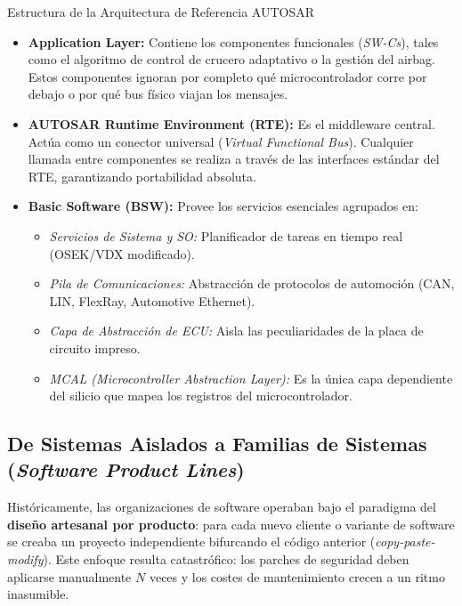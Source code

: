 \begin{definicion}{Estructura de la Arquitectura de Referencia AUTOSAR}
\begin{itemize}[leftmargin=1.5em]
  \item \textbf{Application Layer:} Contiene los componentes funcionales (\emph{SW-Cs}), tales como el algoritmo de control de crucero adaptativo o la gestión del airbag. Estos componentes ignoran por completo qué microcontrolador corre por debajo o por qué bus físico viajan los mensajes.
  \item \textbf{AUTOSAR Runtime Environment (RTE):} Es el middleware central. Actúa como un conector universal (\emph{Virtual Functional Bus}). Cualquier llamada entre componentes se realiza a través de las interfaces estándar del RTE, garantizando portabilidad absoluta.
  \item \textbf{Basic Software (BSW):} Provee los servicios esenciales agrupados en:
    \begin{itemize}
      \item \emph{Servicios de Sistema y SO:} Planificador de tareas en tiempo real (OSEK/VDX modificado).
      \item \emph{Pila de Comunicaciones:} Abstracción de protocolos de automoción (CAN, LIN, FlexRay, Automotive Ethernet).
      \item \emph{Capa de Abstracción de ECU:} Aisla las peculiaridades de la placa de circuito impreso.
      \item \emph{MCAL (Microcontroller Abstraction Layer):} Es la única capa dependiente del silicio que mapea los registros del microcontrolador.
    \end{itemize}
\end{itemize}
\end{definicion}

\subsection{De Sistemas Aislados a Familias de Sistemas (\emph{Software Product Lines})}

Históricamente, las organizaciones de software operaban bajo el paradigma del \textbf{diseño artesanal por producto}: para cada nuevo cliente o variante de software se creaba un proyecto independiente bifurcando el código anterior (\emph{copy-paste-modify}). Este enfoque resulta catastrófico: los parches de seguridad deben aplicarse manualmente $N$ veces y los costes de mantenimiento crecen a un ritmo inasumible.

